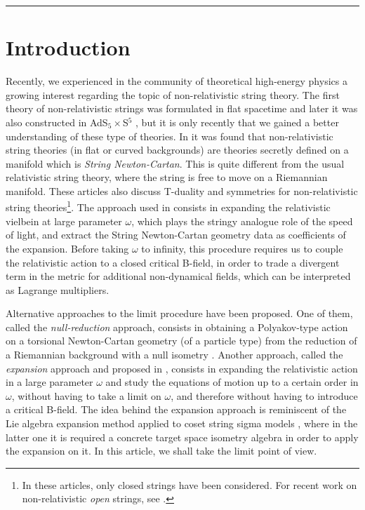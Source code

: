 \documentclass[12pt]{article}
\numberwithin{equation}{section}
\begin{document}
\tableofcontents
\vspace{5mm}
\hrule




 \setcounter{section}{0}
 \setcounter{footnote}{0}

\section*{Introduction}

Recently, we experienced in the community of theoretical high-energy physics a growing interest regarding the topic of non-relativistic string theory.  The first theory of non-relativistic strings was formulated in flat spacetime \cite{Gomis:2000bd,Danielsson:2000gi} and later it was also constructed in AdS$_5\times$S$^5$ \cite{Gomis:2005pg}, but it is only recently that we gained a better understanding of these type of theories. 
In \cite{Bergshoeff:2018yvt, Bergshoeff:2019pij} it was found that non-relativistic string theories (in flat or curved backgrounds) are theories secretly defined on a manifold which is \emph{String Newton-Cartan}.  This is quite different from the usual relativistic string theory, where the string is free to move on a Riemannian manifold. These articles also discuss T-duality and symmetries for non-relativistic string theories\footnote{In these articles, only closed strings have been considered.  For recent work on non-relativistic \emph{open} strings, see \cite{Gomis:2020fui, Gomis:2020izd}.}.  The approach used in \cite{Bergshoeff:2018yvt, Bergshoeff:2019pij} consists in expanding the relativistic vielbein at large parameter $\omega$, which plays the stringy analogue role of the speed of light, and extract the String Newton-Cartan geometry data as coefficients of the expansion. Before taking $\omega$ to infinity, this procedure requires us to couple the relativistic action to a closed critical B-field, in order to trade a divergent term in the metric for additional non-dynamical fields, which can be interpreted as Lagrange multipliers.   

Alternative approaches to the limit procedure have been proposed. One of them, called the \emph{null-reduction} approach, consists in obtaining a Polyakov-type action on a torsional Newton-Cartan geometry (of a particle type) from the reduction of a Riemannian background with a null isometry \cite{Harmark:2017rpg, Harmark:2018cdl,Harmark:2019upf}. 
Another approach, called the \emph{expansion} approach and proposed in \cite{Hartong:2021ekg, Hartong:2022dsx}, consists in expanding the relativistic action in a large parameter $\omega$ and study the equations of motion up to a certain order in $\omega$, without having to take a limit on $\omega$, and therefore without having to introduce a critical B-field. The idea behind the expansion approach is reminiscent of the Lie algebra expansion method applied to coset string sigma models \cite{Fontanella:2020eje}, where in the latter one it is required a concrete target space isometry algebra in order to apply the expansion on it.
In this article, we shall take the limit point of view. 
\end{document}
